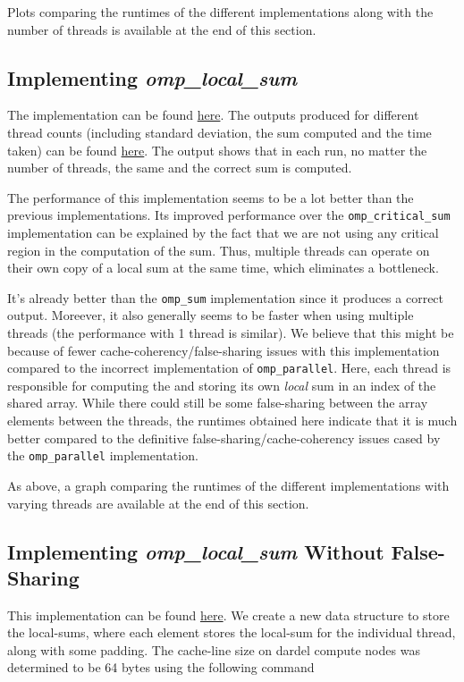 \documentclass[a4paper,10pt]{article}
\begin{document}
Plots comparing the runtimes of the different implementations along with the number of threads is available at the end of this section.

\subsection{Implementing \textit{omp\_local\_sum}}
The implementation can be found \href{https://github.com/paulmyr/DD2356-MethodsHPC/blob/master/3_open_mp/exercise3/omp_local_sum.c}{here}. The outputs produced for different thread counts (including standard deviation, the sum computed and the time taken) can be found \href{https://github.com/paulmyr/DD2356-MethodsHPC/blob/master/3_open_mp/exercise3/outputs/omp_local_output.txt}{here}. The output shows that in each run, no matter the number of threads, the same and the correct sum is computed. 

The performance of this implementation seems to be a lot better than the previous implementations. Its improved performance over the \verb|omp_critical_sum| implementation can be explained by the fact that we are not using any critical region in the computation of the sum. Thus, multiple threads can operate on their own copy of a local sum at the same time, which eliminates a bottleneck. 

It's already better than the \verb|omp_sum| implementation since it produces a correct output. Moreever, it also generally seems to be faster when using multiple threads (the performance with 1 thread is similar). We believe that this might be because of fewer cache-coherency/false-sharing issues with this implementation compared to the incorrect implementation of \verb|omp_parallel|. Here, each thread is responsible for computing the and storing its own \textit{local} sum in an index of the shared array. While there could still be some false-sharing between the array elements between the threads, the runtimes obtained here indicate that it is much better compared to the definitive false-sharing/cache-coherency issues cased by the \verb|omp_parallel| implementation. 

As above, a graph comparing the runtimes of the different implementations with varying threads are available at the end of this section.

\subsection{Implementing \textit{omp\_local\_sum} Without False-Sharing}
This implementation can be found \href{https://github.com/paulmyr/DD2356-MethodsHPC/blob/master/3_open_mp/exercise3/omp_local_no_sharing_sum.c}{here}. We create a new data structure to store the local-sums, where each element stores the local-sum for the individual thread, along with some padding. The cache-line size on dardel compute nodes was determined to be 64 bytes using the following command 
\end{document}
